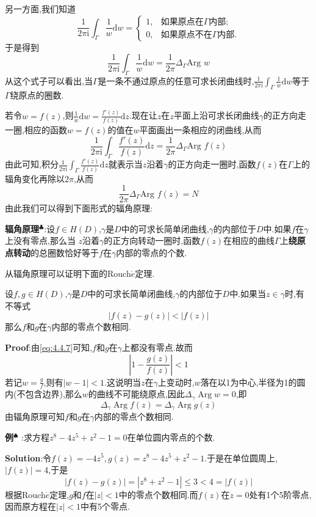 另一方面,我们知道
$$
\frac{1}{2\pi \mathrm{i}}\int_{\Gamma}\frac{1}{w}\mathrm{d}w = 
\begin{cases}
1,&\text{如果原点在}\Gamma\text{内部};\\
0,&\text{如果原点不在}\Gamma\text{内部}.
\end{cases}
$$
于是得到
$$
\frac{1}{2\pi \mathrm{i}}\int_{\Gamma}\frac{1}{w}\mathrm{d}w = \frac{1}{2\pi}\Delta_\Gamma \text{Arg } w 
$$
从这个式子可以看出,当$\Gamma$是一条不通过原点的任意可求长闭曲线时,$\frac{1}{2\pi \mathrm{i}}\int_{\Gamma}\frac{1}{w}\mathrm{d}w $等于$\Gamma$绕原点的圈数.\par
若令$w=f(z)$,则$\frac{1}{w}\mathrm{d}w =\frac{f'(z)}{f(z)}\mathrm{d}z$.现在让$z$在$z$平面上沿可求长闭曲线$\gamma$的正方向走一圈,相应的函数$w=f(z)$的值在$w$平面画出一条相应的闭曲线,从而
$$
\frac{1}{2\pi \mathrm{i}}\int_{\Gamma}\frac{f'(z)}{f(z)}\mathrm{d}z=\frac{1}{2\pi}\Delta_\Gamma \text{Arg }f(z)
$$
由此可知,积分$\frac{1}{2\pi \mathrm{i}}\int_{\Gamma}\frac{f'(z)}{f(z)}\mathrm{d}z$就表示当$z$沿着$\gamma$的正方向走一圈时,函数$f(z)$在$\Gamma$上的辐角变化再除以$2\pi$,从而
$$
\frac{1}{2\pi}\Delta_\Gamma \text{Arg }f(z)=N
$$
由此我们可以得到下面形式的辐角原理:\par
\textbf{辐角原理}$^\clubsuit$:设$f\in H(D)$,$\gamma$是$D$中的可求长简单闭曲线,$\gamma$的内部位于$D$中.如果$f$在$\gamma$上没有零点,那么当 $z$沿着$\gamma$的正方向转动一圈时,函数$f(z)$在相应的曲线$\Gamma$上\textbf{绕原点转动}的总圈数恰好等于$f$在$\gamma$内部的零点的个数.\par
从辐角原理可以证明下面的Rouch$\acute{e}$定理.
\begin{tcolorbox}[colback=KuangNei,colframe=BianKuang,title=\textbf{Rouch$\acute{e}$定理},sharpish corners]
    设$f,g\in H(D)$,$\gamma$是$D$中的可求长简单闭曲线,$\gamma$的内部位于$D$中.如果当$z\in\gamma$时,有不等式
    \begin{equation}
        |f(z)-g(z)|< |f(z)|
        \label{eq:4.4.7}
    \end{equation}
那么$f$和$g$在$\gamma$内部的零点个数相同.
\end{tcolorbox}
\textbf{Proof}:由\eqref{eq:4.4.7}可知,$f$和$g$在$\gamma$上都没有零点.故而
$$
\left|1-\frac{g(z)}{f(z)}\right|<1
$$
若记$w=\frac{g}{f}$,则有$|w-1|<1$.这说明当$z$在$\gamma$上变动时,$w$落在以1为中心,半径为1的圆内(不包含边界),那么$w$的曲线不可能绕原点,因此$\Delta_{\gamma}\operatorname{Arg}w=0$,即
$$
\Delta_{\gamma}\operatorname{Arg}f(z)=\Delta_{\gamma}\operatorname{Arg}g(z)
$$
由辐角原理可知$f$和$g$在$\gamma$内部的零点个数相同.\par
\textbf{例}$^\spadesuit$ :求方程$z^8-4z^5+z^2-1=0$在单位圆内零点的个数.\par
\textbf{Solution}:令$f(z)=-4z^5,g(z)=z^8-4z^5+z^2-1$.于是在单位圆周上,$|f(z)|=4$,于是
$$
|f(z)-g(z)|=|z^8+z^2-1|\leqslant 3<4=|f(z)|
$$
根据Rouch$\acute{e}$定理,$g$和$f$在$|z|<1$中的零点个数相同.而$f(z)$在$z=0$处有1个5阶零点,因而原方程在$|z|<1$中有5个零点.\par